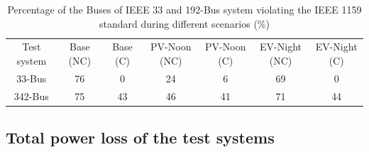 \documentclass[journal]{IEEEtran}
\begin{document}

\begin{center}
\begin{table}
\caption{Percentage of the Buses of IEEE 33 and 192-Bus system violating the IEEE 1159 standard during different scenarios ($\%$)}
\label{VUFstandar}
\centering
\setlength{\tabcolsep}{3.5pt}
\begin{tabular}{c|c|c|c|c|c|c}
\hline\hline
 \multirow{2}{3em}{Test system} &
\multirow{2}{3em}{Base (NC)} & \multirow{2}{3em}{Base (C)} & \multirow{2}{3.8em}{PV-Noon (NC)} & \multirow{2}{3.8em}{PV-Noon (C)} & \multirow{2}{3.9em}{EV-Night (NC)} & \multirow{2}{3.9em}{EV-Night (C)}\\
 & & & & & &\\
\hline
\multirow{2}{*}{33-Bus}&
\multirow{2}{*}{76} & \multirow{2}{*}{0} & \multirow{2}{*}{24} & \multirow{2}{*}{6} & \multirow{2}{*}{69} & \multirow{2}{*}{0}\\
 & & & & & & \\ 
\hline
\multirow{2}{*}{342-Bus}&
\multirow{2}{*}{75} & \multirow{2}{*}{43} & \multirow{2}{*}{46}  & \multirow{2}{*}{41} & \multirow{2}{*}{71} & \multirow{2}{*}{44}\\
 & & & & & &\\ 
\hline\hline
    \end{tabular}

\end{table}
\end{center}

\subsection {Total power loss of the test systems}\label{secloss}
\end{document}
